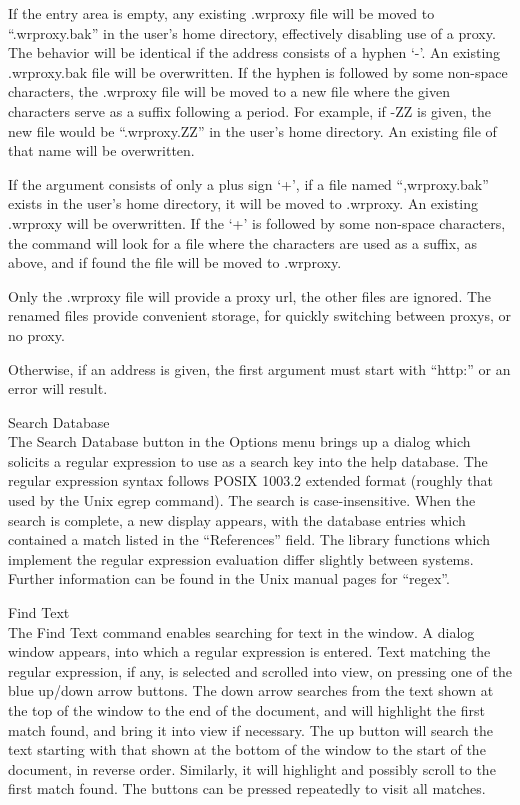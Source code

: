 \begin{description}
If the entry area is empty, any existing {\vt .wrproxy} file will be
moved to ``{\vt .wrproxy.bak}'' in the user's home directory,
effectively disabling use of a proxy.  The behavior will be identical
if the address consists of a hyphen `{\vt -}'.  An existing {\vt
.wrproxy.bak} file will be overwritten.  If the hyphen is followed by
some non-space characters, the {\vt .wrproxy} file will be moved to a
new file where the given characters serve as a suffix following a
period.  For example, if {\vt -ZZ} is given, the new file would be
``{\vt .wrproxy.ZZ}'' in the user's home directory.  An existing file
of that name will be overwritten.

If the argument consists of only a plus sign `{\vt +}', if a file
named ``{\vt ,wrproxy.bak}'' exists in the user's home directory, it
will be moved to {\vt .wrproxy}.  An existing {\vt .wrproxy} will be
overwritten.  If the `{\vt +}' is followed by some non-space
characters, the command will look for a file where the characters are
used as a suffix, as above, and if found the file will be moved to
{\vt .wrproxy}.

Only the {\vt .wrproxy} file will provide a proxy url, the other files
are ignored.  The renamed files provide convenient storage, for
quickly switching between proxys, or no proxy.

Otherwise, if an address is given, the first argument must start with
``{\vt http:}'' or an error will result.

\item{\cb Search Database}\\
The {\cb Search Database} button in the {\cb Options} menu brings up a
dialog which solicits a regular expression to use as a search key into
the help database.  The regular expression syntax follows POSIX 1003.2
extended format (roughly that used by the Unix {\vt egrep} command). 
The search is case-insensitive.  When the search is complete, a new
display appears, with the database entries which contained a match
listed in the ``References'' field.  The library functions which
implement the regular expression evaluation differ slightly between
systems.  Further information can be found in the Unix manual pages
for ``regex''.

\item{\cb Find Text}\\
The {\cb Find Text} command enables searching for text in the window. 
A dialog window appears, into which a regular expression is entered. 
Text matching the regular expression, if any, is selected and scrolled
into view, on pressing one of the blue up/down arrow buttons.  The
down arrow searches from the text shown at the top of the window to
the end of the document, and will highlight the first match found, and
bring it into view if necessary.  The up button will search the text
starting with that shown at the bottom of the window to the start of
the document, in reverse order.  Similarly, it will highlight and
possibly scroll to the first match found.  The buttons can be pressed
repeatedly to visit all matches.


\end{description}
